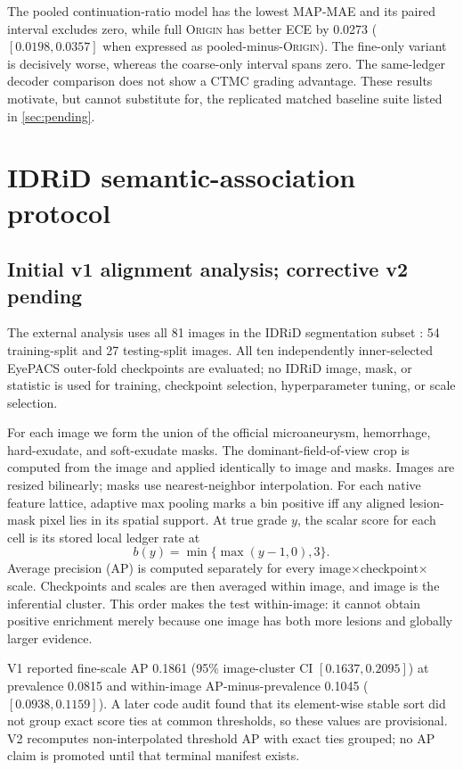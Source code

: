 \documentclass[10pt,twocolumn,letterpaper]{article}
\newcommand{\method}{\textsc{Origin}\xspace}
\begin{document}
The pooled continuation-ratio model has the lowest MAP-MAE and its paired
interval excludes zero, while full \method has better ECE by 0.0273
($[0.0198,0.0357]$ when expressed as pooled-minus-\method).  The fine-only
variant is decisively worse, whereas the coarse-only interval spans zero.
The same-ledger decoder comparison does not show a CTMC grading advantage.
These results motivate, but cannot substitute for, the replicated matched
baseline suite listed in \cref{sec:pending}.

\section{IDRiD semantic-association protocol}
\label{sec:idrid}

\subsection{Initial v1 alignment analysis; corrective v2 pending}

The external analysis uses all 81 images in the IDRiD segmentation subset
\cite{porwal2020idrid}: 54 training-split and 27 testing-split images.  All ten
independently inner-selected EyePACS outer-fold checkpoints are evaluated; no
IDRiD image, mask, or statistic is used for training, checkpoint selection,
hyperparameter tuning, or scale selection.

For each image we form the union of the official microaneurysm, hemorrhage,
hard-exudate, and soft-exudate masks.  The dominant-field-of-view crop is
computed from the image and applied identically to image and masks.  Images are
resized bilinearly; masks use nearest-neighbor interpolation.  For each native
feature lattice, adaptive max pooling marks a bin positive iff any aligned
lesion-mask pixel lies in its spatial support.  At true grade $y$, the scalar
score for each cell is its stored local ledger rate at
\begin{equation}
 b(y)=\min\{\max(y-1,0),3\}.
 \label{eq:idrid-boundary}
\end{equation}
Average precision (AP) is computed separately for every
image$\times$checkpoint$\times$scale.  Checkpoints and scales are then averaged
within image, and image is the inferential cluster.  This order makes the test
within-image: it cannot obtain positive enrichment merely because one image has
both more lesions and globally larger evidence.

V1 reported fine-scale AP 0.1861 (95\% image-cluster CI
$[0.1637,0.2095]$) at prevalence 0.0815 and within-image
AP-minus-prevalence 0.1045 ($[0.0938,0.1159]$).  A later code audit found that
its element-wise stable sort did not group exact score ties at common
thresholds, so these values are provisional.  V2 recomputes non-interpolated
threshold AP with exact ties grouped; no AP claim is promoted until that
terminal manifest exists.
\end{document}
